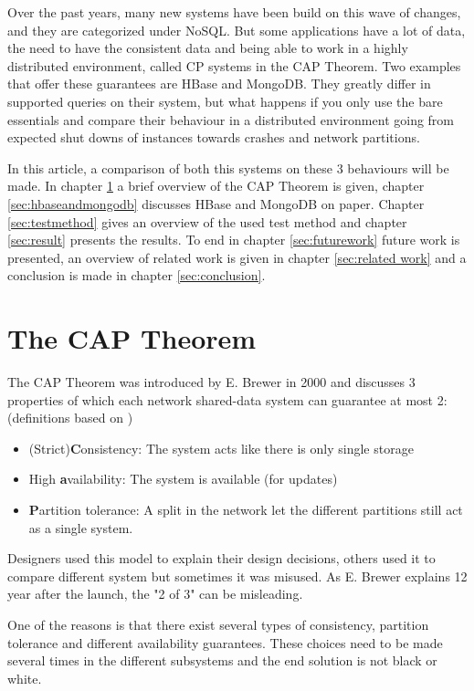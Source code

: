 \documentclass[final,5p,times]{elsarticle}
\begin{document}
Over the past years, many new systems have been build on this wave of changes, and they are categorized under NoSQL. But some applications have a lot of data, the need to have the consistent data and being able to work in a highly distributed environment, called CP systems in the CAP Theorem. Two examples that offer these guarantees are HBase and MongoDB. They greatly differ in supported queries on their system, but what happens if you only use the bare essentials and compare their behaviour in a distributed environment going from expected shut downs of instances towards crashes and network partitions. 

In this article, a comparison of both this systems on these 3 behaviours will be made. In chapter \ref{sec:CAPTheorem} a brief overview of the CAP Theorem is given, chapter \ref{sec:hbaseandmongodb} discusses HBase and MongoDB on paper. Chapter \ref{sec:testmethod} gives an overview of the used test method and chapter \ref{sec:result} presents the results. To end in chapter \ref{sec:futurework} future work is presented, an overview of related work is given in chapter \ref{sec:related work} and a conclusion is made in chapter \ref{sec:conclusion}.  

\section{The CAP Theorem\cite{brewer2000towards}\cite{brewer2012cap}}\label{sec:CAPTheorem}
The CAP Theorem was introduced by E. Brewer \cite{brewer2000towards}  in 2000 and discusses 3 properties of which each network shared-data system can guarantee at most 2: (definitions based on \cite{brewer2012cap})
\begin{itemize}
\item (Strict)\textbf{C}onsistency: The system acts like there is only single storage 
\item High \textbf{a}vailability: The system is available (for updates)
\item \textbf{P}artition tolerance: A split in the network let the different partitions still act as a single system. 
\end{itemize}
Designers used this model to explain their design decisions, others used it to compare different system but sometimes it was misused. As E. Brewer explains 12 year after the launch, the "2 of 3" can be misleading.

One of the reasons is that there exist several types of consistency, partition tolerance and different availability guarantees. These choices need to be made several times in the different subsystems and the end solution is not black or white. 
\end{document}
